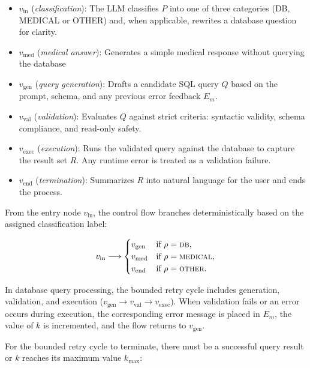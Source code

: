 \begin{itemize}
    \item $v_{\mathrm{in}}$ (\emph{classification}): The LLM classifies $P$ into one of three categories (DB, MEDICAL or OTHER) and, when applicable, rewrites a database question for clarity.
    \item $v_{\mathrm{med}}$ (\emph{medical answer}): Generates a simple medical response without querying the database
    \item $v_{\mathrm{gen}}$ (\emph{query generation}): Drafts a candidate SQL query $Q$ based on the prompt, schema, and any previous error feedback $E_m$.
    \item $v_{\mathrm{val}}$ (\emph{validation}): Evaluates $Q$ against strict criteria: syntactic validity, schema compliance, and read-only safety.
    \item $v_{\mathrm{exec}}$ (\emph{execution}): Runs the validated query against the database to capture the result set $R$. Any runtime error is treated as a validation failure.
    \item $v_{\mathrm{end}}$ (\emph{termination}): Summarizes $R$ into natural language for the user and ends the process.
\end{itemize}

From the entry node $v_{\mathrm{in}}$, the control flow branches deterministically based on the assigned classification label:

\begin{equation}
    v_{\mathrm{in}} \longrightarrow
    \begin{cases}
        v_{\mathrm{gen}} & \text{if } \rho = \textsc{db},\\
        v_{\mathrm{med}} & \text{if } \rho = \textsc{medical},\\
        v_{\mathrm{end}} & \text{if } \rho = \textsc{other}.
    \end{cases}
    \label{eq:branch}
\end{equation}

In database query processing, the bounded retry cycle includes generation, validation, and execution ($v_{\mathrm{gen}} \to v_{\mathrm{val}} \to v_{\mathrm{exec}}$). When validation fails or an error occurs during execution, the corresponding error message is placed in $E_m$, the value of $k$ is incremented, and the flow returns to $v_{\mathrm{gen}}$.

For the bounded retry cycle to terminate, there must be a successful query result or $k$ reaches its maximum value $k_{\max}$:

